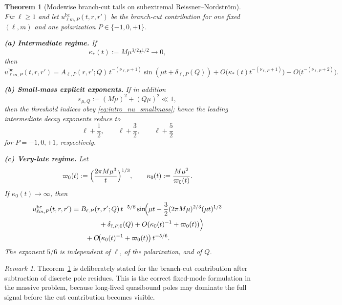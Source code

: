 \documentclass[12pt]{article}
\numberwithin{equation}{section}
\theoremstyle{plain}
\newtheorem{theorem}{Theorem}[section]
\theoremstyle{definition}
\theoremstyle{remark}
\newtheorem{remark}{Remark}[section]
\newcommand{\bc}{\mathrm{bc}}
\newcommand{\vp}{\varpi}
\newcommand{\kap}{\kappa}
\newcommand{\eps}{\varepsilon}
\begin{document}
\begin{theorem}[Modewise branch-cut tails on subextremal Reissner--Nordstr\"om]\label{thm:main}
Fix $\ell\ge1$ and let $u^{\bc}_{\ell m,P}(t,r,r')$ be the branch-cut contribution for one fixed $(\ell,m)$ and one polarization $P\in\{-1,0,+1\}$.

\smallskip
\noindent\textbf{(a) Intermediate regime.}
If
\begin{equation}\label{eq:intro_kappastar}
   \kap_*(t):=M\mu^{3/2}t^{1/2}\to0,
\end{equation}
then
\begin{equation}\label{eq:intro_intermediate_general}
   u^{\bc}_{\ell m,P}(t,r,r')
   =
   A_{\ell,P}(r,r';Q)\,t^{-(\nu_{\ell,P}+1)}\sin(\mu t+\delta_{\ell,P}(Q))
   +O\!\bigl(\kap_*(t)t^{-(\nu_{\ell,P}+1)}\bigr)
   +O\!\bigl(t^{-(\nu_{\ell,P}+2)}\bigr).
\end{equation}

\smallskip
\noindent\textbf{(b) Small-mass explicit exponents.}
If in addition
\[
   \eps_{\mu,Q}:=(M\mu)^2+(Q\mu)^2\ll1,
\]
then the threshold indices obey \eqref{eq:intro_nu_smallmass}; hence the leading intermediate decay exponents reduce to
\[
   \ell+\frac12,\qquad
   \ell+\frac32,\qquad
   \ell+\frac52
\]
for $P=-1,0,+1$, respectively.

\smallskip
\noindent\textbf{(c) Very-late regime.}
Let
\begin{equation}\label{eq:intro_vp0}
   \vp_0(t):=\Bigl(\frac{2\pi M\mu^3}{t}\Bigr)^{1/3},
   \qquad
   \kap_0(t):=\frac{M\mu^2}{\vp_0(t)}.
\end{equation}
If $\kap_0(t)\to\infty$, then
\begin{align}\label{eq:intro_late_general}
   u^{\bc}_{\ell m,P}(t,r,r')
   &=
   B_{\ell,P}(r,r';Q)\,t^{-5/6}
   \sin\!\Bigl(
      \mu t
      -\frac32(2\pi M\mu)^{2/3}(\mu t)^{1/3}
      \notag\\
   &\qquad\qquad
      +\delta_{\ell,P,0}(Q)
      +O(\kap_0(t)^{-1}+\vp_0(t))
   \Bigr)
   \notag\\
   &\qquad
   +O\!\bigl(\kap_0(t)^{-1}+\vp_0(t)\bigr)\,t^{-5/6}.
\end{align}
The exponent $5/6$ is independent of $\ell$, of the polarization, and of $Q$.
\end{theorem}

\begin{remark}\label{rem:scope_intro}
Theorem~\ref{thm:main} is deliberately stated for the branch-cut contribution after subtraction of discrete pole residues.  This is the correct fixed-mode formulation in the massive problem, because long-lived quasibound poles may dominate the full signal before the cut contribution becomes visible.
\end{remark}
\end{document}
